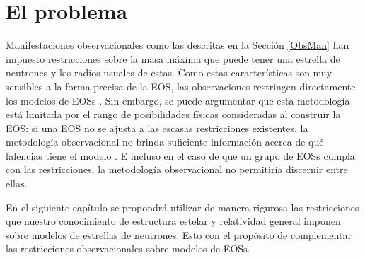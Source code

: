 \section{El problema}
\noindent Manifestaciones observacionales como las descritas en la Sección \ref{ObsMan} han impuesto restricciones sobre la masa máxima que puede tener una estrella de neutrones y los radios usuales de estas. Como estas características son muy sensibles a la forma precisa de la EOS, las observaciones restringen directamente los modelos de EOSs \cite{Ozel2016}. Sin embargo, se puede argumentar que esta metodología está limitada por el rango de posibilidades físicas consideradas al construir la EOS: si una EOS no se ajusta a las escasas restricciones existentes, la metodología observacional no brinda suficiente información acerca de qué falencias tiene el modelo \cite{Raithel2017}. E incluso en el caso de que un grupo de EOSs cumpla con las restricciones, la metodología observacional no permitiría discernir entre ellas. 

En el siguiente capítulo se propondrá utilizar de manera rigurosa las restricciones que nuestro conocimiento de estructura estelar y relatividad general imponen sobre modelos de estrellas de neutrones. Esto con el propósito de complementar las restricciones observacionales sobre modelos de EOSs.